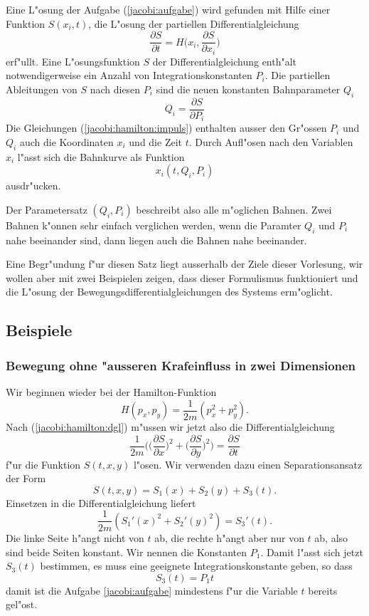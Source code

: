 \begin{satz}
\label{jacobi:satz}
Eine L"osung der Aufgabe (\ref{jacobi:aufgabe}) wird gefunden mit
Hilfe einer Funktion $S(x_i, t)$, die L"osung der partiellen
Differentialgleichung
\begin{equation}
\frac{\partial S}{\partial t}
=
H\biggl(
x_i,
\frac{\partial S}{\partial x_i}
\biggr)
\label{jacobi:hamilton:dgl}
\end{equation}
erf"ullt.
Eine L"osungsfunktion $S$ der Differentialgleichung enth"alt notwendigerweise
ein Anzahl von Integrationskonstanten $P_i$.
Die partiellen Ableitungen von $S$ nach diesen $P_i$
sind die neuen konstanten Bahnparameter $Q_i$
\begin{equation}
Q_i=\frac{\partial S}{\partial P_i}
\label{jacobi:hamilton:impuls}
\end{equation}
Die Gleichungen (\ref{jacobi:hamilton:impuls}) enthalten ausser den
Gr"ossen $P_i$ und $Q_i$ auch die Koordinaten $x_i$ und die Zeit $t$.
Durch Aufl"osen nach den Variablen $x_i$ l"asst sich die Bahnkurve
als Funktion
\[
x_i(t,Q_i,P_i)
\]
ausdr"ucken.
\end{satz}
Der Parametersatz $(Q_i,P_i)$ beschreibt also alle m"oglichen 
Bahnen. Zwei Bahnen k"onnen sehr einfach verglichen werden, wenn die
Paramter $Q_i$ und $P_i$ nahe beeinander sind, dann liegen auch
die Bahnen nahe beeinander.

Eine Begr"undung f"ur diesen Satz liegt ausserhalb der Ziele
dieser Vorlesung, wir wollen aber mit zwei Beispielen zeigen,
dass dieser Formulismus funktioniert und die L"osung der
Bewegungsdifferentialgleichungen des Systems erm"oglicht.

\subsection{Beispiele}
\subsubsection{Bewegung ohne "ausseren Krafeinfluss in zwei Dimensionen}
Wir beginnen wieder bei der Hamilton-Funktion 
\[
H(p_x, p_y)=\frac1{2m}(p_x^2+p_y^2).
\]
Nach (\ref{jacobi:hamilton:dgl}) m"ussen wir jetzt also die
Differentialgleichung
\[
\frac1{2m}\biggl(
\biggl(\frac{\partial S}{\partial x}\biggr)^2
+
\biggl(\frac{\partial S}{\partial y}\biggr)^2
\biggr)=\frac{\partial S}{\partial t}
\]
f"ur die Funktion $S(t,x,y)$ l"osen. Wir verwenden dazu einen 
Separationsansatz der Form
\[
S(t,x,y)=S_1(x)+S_2(y) + S_3(t).
\]
Einsetzen in die Differentialgleichung liefert
\begin{equation}
\frac1{2m}( S_1'(x)^2+S_2'(y)^2)=S_3'(t).
\label{jacobi:kraeftefrei:sep1}
\end{equation}
Die linke Seite h"angt nicht von $t$ ab, die rechte h"angt
aber nur von $t$ ab, also sind beide Seiten konstant.
Wir nennen die Konstanten $P_1$. Damit l"asst sich
jetzt $S_3(t)$ bestimmen, es muss eine geeignete Integrationskonstante
geben, so dass
\[
S_3(t)=P_1t
\]
damit ist die Aufgabe \ref{jacobi:aufgabe} mindestens f"ur die Variable
$t$ bereits gel"ost.


